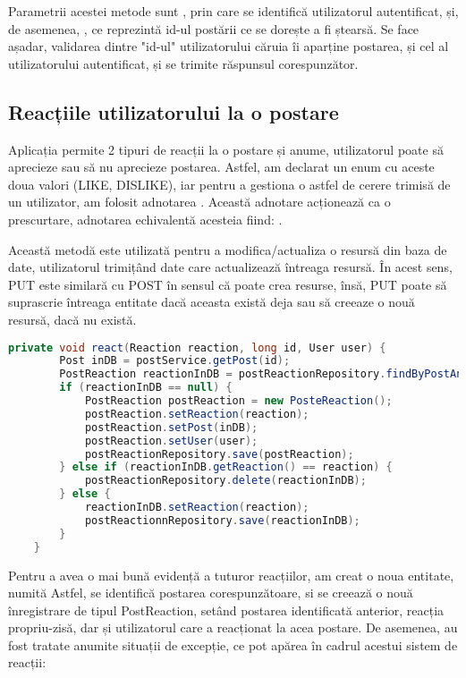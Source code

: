 Parametrii acestei metode sunt , prin care se identifică utilizatorul autentificat, și, de asemenea, , ce reprezintă id-ul postării ce se dorește a fi ștearsă. Se face așadar, validarea dintre "id-ul" utilizatorului căruia îi aparține postarea, și cel al utilizatorului autentificat, și se trimite răspunsul corespunzător.\newline

\subsection{Reacțiile utilizatorului la o postare}

Aplicația permite 2 tipuri de reacții la o postare și anume, utilizatorul poate să aprecieze sau să nu aprecieze postarea. Astfel, am declarat un enum cu aceste doua valori (LIKE, DISLIKE), iar pentru a gestiona o astfel de cerere trimisă de un utilizator, am folosit adnotarea . Această adnotare acționează ca o prescurtare, adnotarea echivalentă acesteia fiind: .\newline

Această metodă este utilizată pentru a modifica/actualiza o resursă din baza de date, utilizatorul trimițând date care actualizează întreaga resursă. În acest sens, PUT este similară cu POST în sensul că poate crea resurse, însă, PUT poate să suprascrie întreaga entitate dacă aceasta există deja sau să creeaze o nouă resursă, dacă nu există.\newline

\begin{lstlisting}[language=Java]
	private void react(Reaction reaction, long id, User user) {
		Post inDB = postService.getPost(id);
		PostReaction reactionInDB = postReactionRepository.findByPostAndUser(inDB, user);
		if (reactionInDB == null) {
			PostReaction postReaction = new PosteReaction();
			postReaction.setReaction(reaction);
			postReaction.setPost(inDB);
			postReaction.setUser(user);
			postReactionRepository.save(postReaction);
		} else if (reactionInDB.getReaction() == reaction) {
			postReactionRepository.delete(reactionInDB);
		} else {
			reactionInDB.setReaction(reaction);
			postReactionnRepository.save(reactionInDB);
		}
	}
\end{lstlisting}
\bigskip

Pentru a avea o mai bună evidență a tuturor reacțiilor, am creat o noua entitate, numită  Astfel, se identifică postarea corespunzătoare, si se creează o nouă înregistrare de tipul PostReaction, setând postarea identificată anterior, reacția propriu-zisă, dar și utilizatorul care a reacționat la acea postare. De asemenea, au fost tratate anumite situații de excepție, ce pot apărea în cadrul acestui sistem de reacții:


